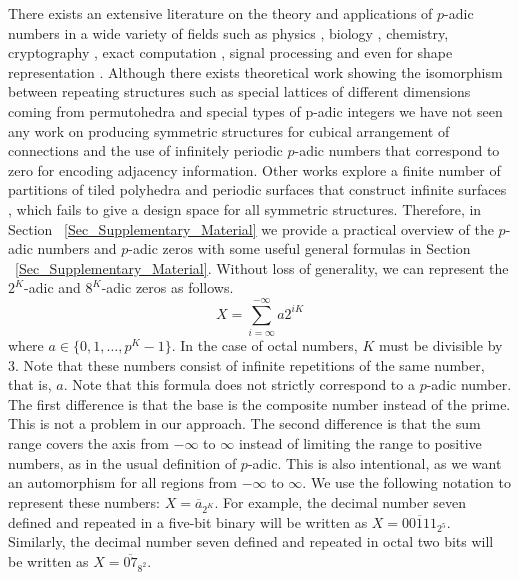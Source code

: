 \documentclass[times,twocolumn,final]{elsarticle}
\begin{document}
There exists an extensive literature on the theory and applications of $p$-adic numbers in a wide variety of fields such as physics \cite{brekke1993p, dragovich2009p}, biology \cite{dragovich2010p,dragovich2021p},  chemistry\cite{khrennikov2016reacdiffpadic}, cryptography \cite{calderbank1995modular, da2020mathematical}, exact computation \cite{dixon1982exact, krishnamurthy1975finite, caruso2017padiccomputation}, signal processing\cite{bhandari2023weavepadic} and even for shape representation \cite{cornelissen2005p}. Although there exists theoretical work showing the isomorphism between repeating structures such as special lattices of different dimensions coming from permutohedra and special types of p-adic integers \cite{kitto1991padiclattice, kitto1994padicpermutohedra} we have not seen any work on producing symmetric structures for cubical arrangement of connections and the use of infinitely periodic $p$-adic numbers that correspond to zero for encoding adjacency information. Other works explore a finite number of partitions of tiled polyhedra \cite{scott2014tricolor} and periodic surfaces that construct infinite surfaces \cite{gillispie20094IsogonalSponges, duffield2024periodic, burt2007periodic}, which fails to give a design space for all symmetric structures. Therefore, in Section ~\ref{Sec_Supplementary_Material} we provide a practical overview of the $p$-adic numbers and $p$-adic zeros with some useful general formulas in Section ~\ref{Sec_Supplementary_Material}. 
Without loss of generality, we can represent the $2^K$-adic and $8^K$-adic zeros as follows. 
\begin{equation}
X = \sum_{i=\infty}^{-\infty} a 2^{iK}
\end{equation} 
where $a \in \{0,1,\ldots,p^K-1\}$. In the case of octal numbers, $K$ must be divisible by $3$. Note that these numbers consist of infinite repetitions of the same number, that is, $a$. Note that this formula does not strictly correspond to a $p$-adic number. The first difference is that the base is the composite number instead of the prime. This is not a problem in our approach. The second difference is that the sum range covers the axis from $-\infty$ to $\infty$ instead of limiting the range to positive numbers, as in the usual definition of $p$-adic. This is also intentional, as we want an automorphism for all regions from $-\infty$ to $\infty$. We use the following notation to represent these numbers:
$X= \overline{a}_{2^K}$. For example, the decimal number seven defined and repeated in a five-bit binary will be written as $X= \overline{00111}_{2^5}$. Similarly, the decimal number seven defined and repeated in octal two bits will be written as $X= \overline{07}_{8^2}$.
\end{document}

